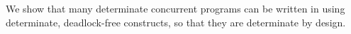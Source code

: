 We show that many determinate concurrent programs can be written in
\Xten{} using determinate, deadlock-free constructs, so that they are
determinate by design.

